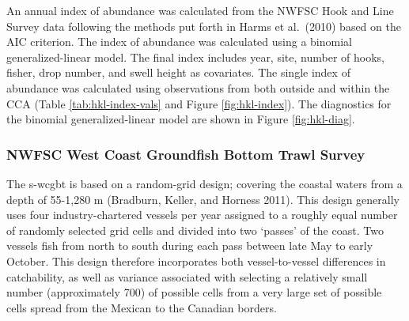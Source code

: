 \documentclass[11pt,
  english,
  a4paper,
]{article}
\begin{document}
\leavevmode\tagmcend\tagstructend\par


An annual index of abundance was calculated from the NWFSC Hook and Line Survey data following the methods put forth in Harms et al.~{(2010)\leavevmode\tagmcend\tagstructend} based on the AIC criterion. The index of abundance was calculated using a binomial generalized-linear model. The final index includes year, site, number of hooks, fisher, drop number, and swell height as covariates. The single index of abundance was calculated using observations from both outside and within the CCA (Table \ref{tab:hkl-index-vals} and Figure \ref{fig:hkl-index}). The diagnostics for the binomial generalized-linear model are shown in Figure \ref{fig:hkl-diag}.

\leavevmode\tagmcend\tagstructend\par


\hypertarget{nwfsc-west-coast-groundfish-bottom-trawl-survey}{%
\subsubsection{NWFSC West Coast Groundfish Bottom Trawl Survey}\label{nwfsc-west-coast-groundfish-bottom-trawl-survey}}

\leavevmode\tagmcend\tagstructend


The \gls{s-wcgbt} is based on a random-grid design; covering the coastal waters from a depth of 55-1,280 m {(Bradburn, Keller, and Horness 2011)\leavevmode\tagmcend\tagstructend}. This design generally uses four industry-chartered vessels per year assigned to a roughly equal number of randomly selected grid cells and divided into two `passes' of the coast. Two vessels fish from north to south during each pass between late May to early October. This design therefore incorporates both vessel-to-vessel differences in catchability, as well as variance associated with selecting a relatively small number (approximately 700) of possible cells from a very large set of possible cells spread from the Mexican to the Canadian borders.

\leavevmode\tagmcend\tagstructend\par
\end{document}
